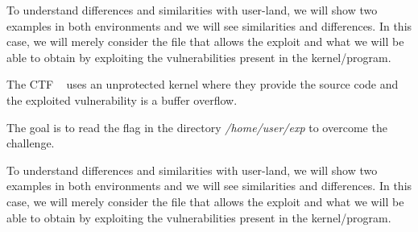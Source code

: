 \documentclass{masterthesis}
\begin{document}
To understand differences and similarities with user-land, we will show two examples in both environments and we will see similarities and differences. In this case, we will merely consider the file that allows the exploit and what we will be able to obtain by exploiting the vulnerabilities present in the kernel/program.

The CTF ~\cite{m0leconTeaser2020_babyk} uses an unprotected kernel where they provide the source code and the exploited vulnerability is a buffer overflow.

The goal is to read the flag in the directory \textit{/home/user/exp} to overcome the challenge.

To understand differences and similarities with user-land, we will show two examples in both environments and we will see similarities and differences. In this case, we will merely consider the file that allows the exploit and what we will be able to obtain by exploiting the vulnerabilities present in the kernel/program.
\end{document}
